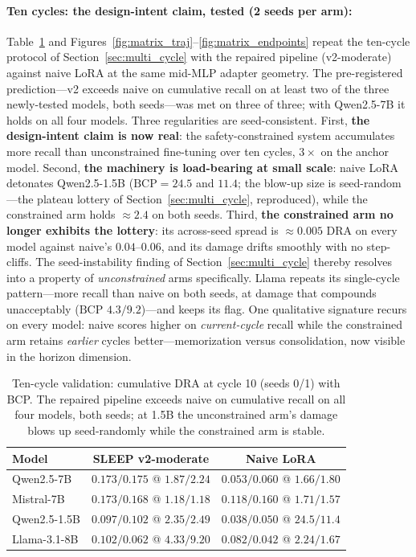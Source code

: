 \paragraph{Ten cycles: the design-intent claim, tested (2 seeds per arm):} Table~\ref{tab:matrix_multi} and Figures~\ref{fig:matrix_traj}--\ref{fig:matrix_endpoints} repeat the ten-cycle protocol of Section~\ref{sec:multi_cycle} with the repaired pipeline (v2-moderate) against naive LoRA at the same mid-MLP adapter geometry. The pre-registered prediction---v2 exceeds naive on cumulative recall on at least two of the three newly-tested models, both seeds---was met on three of three; with Qwen2.5-7B it holds on all four models. Three regularities are seed-consistent. First, \textbf{the design-intent claim is now real}: the safety-constrained system accumulates more recall than unconstrained fine-tuning over ten cycles, $3\times$ on the anchor model. Second, \textbf{the machinery is load-bearing at small scale}: naive LoRA detonates Qwen2.5-1.5B ($\mathrm{BCP}=24.5$ and $11.4$; the blow-up size is seed-random---the plateau lottery of Section~\ref{sec:multi_cycle}, reproduced), while the constrained arm holds $\approx 2.4$ on both seeds. Third, \textbf{the constrained arm no longer exhibits the lottery}: its across-seed spread is $\approx 0.005$ DRA on every model against naive's $0.04$--$0.06$, and its damage drifts smoothly with no step-cliffs. The seed-instability finding of Section~\ref{sec:multi_cycle} thereby resolves into a property of \emph{unconstrained} arms specifically. Llama repeats its single-cycle pattern---more recall than naive on both seeds, at damage that compounds unacceptably ($\mathrm{BCP}$ $4.3/9.2$)---and keeps its flag. One qualitative signature recurs on every model: naive scores higher on \emph{current-cycle} recall while the constrained arm retains \emph{earlier} cycles better---memorization versus consolidation, now visible in the horizon dimension.

\begin{table}[t]
\centering
\caption{Ten-cycle validation: cumulative DRA at cycle 10 (seeds 0/1) with BCP. The repaired pipeline exceeds naive on cumulative recall on all four models, both seeds; at 1.5B the unconstrained arm's damage blows up seed-randomly while the constrained arm is stable.}
\label{tab:matrix_multi}
\begin{tabular}{lcc}
\toprule
Model & SLEEP v2-moderate & Naive LoRA \\
\midrule
Qwen2.5-7B   & $\mathbf{0.173/0.175}$ @ $1.87/2.24$ & $0.053/0.060$ @ $1.66/1.80$ \\
Mistral-7B   & $\mathbf{0.173/0.168}$ @ $1.18/1.18$ & $0.118/0.160$ @ $1.71/1.57$ \\
Qwen2.5-1.5B & $\mathbf{0.097/0.102}$ @ $2.35/2.49$ & $0.038/0.050$ @ $\mathbf{24.5/11.4}$ \\
Llama-3.1-8B & $0.102/0.062$ @ $4.33/9.20$ & $0.082/0.042$ @ $2.24/1.67$ \\
\bottomrule
\end{tabular}
\end{table}

